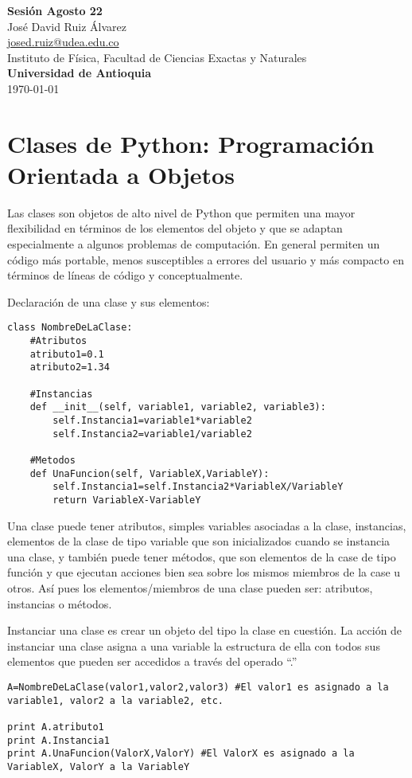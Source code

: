 \documentclass[10.5pt]{article}
\begin{document}
\noindent
\begin{minipage}[b]{0.75\linewidth}
{\LARGE\bf Sesión Agosto 22}\\ %
\large{Jos\'{e} David Ruiz \'{A}lvarez} \\
\small{\href{mailto:josed.ruiz@udea.edu.co}{josed.ruiz@udea.edu.co}} \\ %
\normalsize{Instituto de Física, Facultad de Ciencias Exactas y Naturales} \\%
\normalsize{\bf Universidad de Antioquia} \\[8mm]
\today %
\end{minipage}%


\section{Clases de Python: Programación Orientada a Objetos}

Las clases son objetos de alto nivel de Python que permiten una mayor flexibilidad en términos de los elementos del objeto y que se adaptan especialmente a algunos problemas de computación. En general permiten un código más portable, menos susceptibles a errores del usuario y más compacto en términos de líneas de código y conceptualmente.

Declaración de una clase y sus elementos:
\begin{verbatim}
class NombreDeLaClase:
    #Atributos
    atributo1=0.1
    atributo2=1.34

    #Instancias
    def __init__(self, variable1, variable2, variable3):
        self.Instancia1=variable1*variable2
        self.Instancia2=variable1/variable2

    #Metodos
    def UnaFuncion(self, VariableX,VariableY):
        self.Instancia1=self.Instancia2*VariableX/VariableY
        return VariableX-VariableY
\end{verbatim}

Una clase puede tener atributos, simples variables asociadas a la clase, instancias, elementos de la clase de tipo variable que son inicializados cuando se instancia una clase, y también puede tener métodos, que son elementos de la case de tipo función y que ejecutan acciones bien sea sobre los mismos miembros de la case u otros. Así pues los elementos/miembros de una clase pueden ser: atributos, instancias o métodos.

Instanciar una clase es crear un objeto del tipo la clase en cuestión. La acción de instanciar una clase asigna a una variable la estructura de ella con todos sus elementos que pueden ser accedidos a través del operado ``.''
\begin{verbatim}
A=NombreDeLaClase(valor1,valor2,valor3) #El valor1 es asignado a la variable1, valor2 a la variable2, etc.

print A.atributo1
print A.Instancia1
print A.UnaFuncion(ValorX,ValorY) #El ValorX es asignado a la VariableX, ValorY a la VariableY
\end{verbatim}
 
\end{document}
